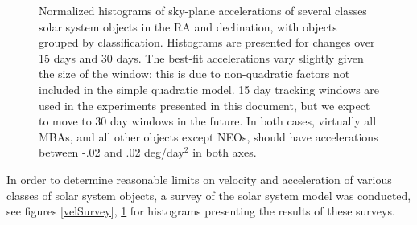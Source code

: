 \documentclass[12pt,preprint]{aastex}
\begin{document}
\begin{figure}[ht!]
  \caption{Normalized histograms of sky-plane accelerations of several
    classes solar system objects in the RA and declination, with
    objects grouped by classification.  Histograms are presented for
    changes over 15 days and 30 days. The best-fit accelerations vary
    slightly given the size of the window; this is due to
    non-quadratic factors not included in the simple quadratic model.
    15 day tracking windows are used in the experiments presented in
    this document, but we expect to move to 30 day windows in the
    future.  In both cases, virtually all MBAs, and all other objects
    except NEOs, should have accelerations between -.02 and .02
    deg/day$^2$ in both axes.}
  \label{accSurvey}
\end{figure}


In order to determine reasonable limits on velocity and acceleration
of various classes of solar system objects, a survey of the solar
system model \citep{Grav2011} was conducted, see figures
\ref{velSurvey}, \ref{accSurvey} for histograms
presenting the results of these surveys.
\end{document}
